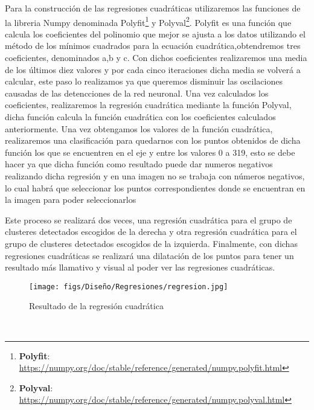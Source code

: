 Para la construcción de las regresiones cuadráticas utilizaremos las funciones de la libreria Numpy denominada Polyfit\footnote{\textbf{Polyfit}: \url{https://numpy.org/doc/stable/reference/generated/numpy.polyfit.html}}
y Polyval\footnote{\textbf{Polyval}: \url{ https://numpy.org/doc/stable/reference/generated/numpy.polyval.html}}. 
Polyfit es una función que calcula los  coeficientes del polinomio que mejor se ajusta a los datos utilizando el método de los mínimos 
cuadrados para la ecuación cuadrática,obtendremos tres coeficientes, denominados a,b y c. \newline
\newline
Con dichos coeficientes realizaremos una media de los últimos diez valores y por cada cinco iteraciones dicha media se volverá a calcular, este paso lo realizamos ya que 
queremos disminuir las oscilaciones causadas de las detencciones de la red neuronal. Una vez calculados los coeficientes, realizaremos la regresión cuadrática mediante la función Polyval, dicha función calcula
la función cuadrática con los coeficientes calculados anteriormente. \newline 
Una vez obtengamos los valores de la función cuadrática, realizaremos una clasificación para quedarnos con los puntos obtenidos
de dicha función los que se encuentren en el eje y entre los valores 0 a 319, esto se debe hacer ya que dicha función como resultado puede dar numeros negativos realizando dicha regresión y en una 
imagen no se trabaja con números negativos, lo cual habrá que seleccionar los puntos correspondientes donde se encuentran en la imagen para poder seleccionarlos \newline

Este proceso se realizará dos veces, una regresión cuadrática para el grupo de clusteres detectados escogidos de la derecha y otra regresión cuadrática para el grupo de clusteres detectados
escogidos de la izquierda. \newline
Finalmente, con dichas regresiones cuadráticas se realizará una dilatación de los puntos para tener un resultado más llamativo y visual al poder
ver las regresiones cuadráticas.\newline

\begin{figure} [H]
  \begin{center}
    \texttt{[image: figs/Diseño/Regresiones/regresion.jpg]}
  \end{center}
  \caption{Resultado de la regresión cuadrática}
  \label{fig:regresión cuadrática}
\end{figure}\

